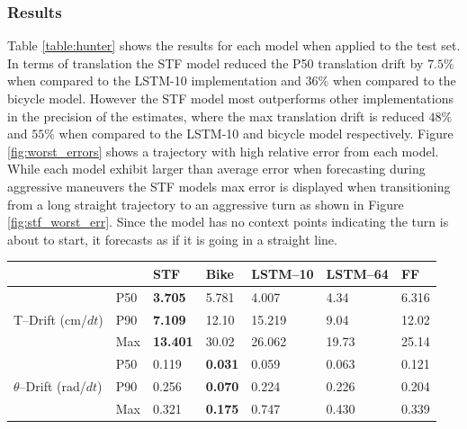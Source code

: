 \documentclass[letterpaper, 10 pt, conference]{ieeeconf}  %
\begin{document}
 \subsubsection{Results}


Table \ref{table:hunter} shows the results for each model when applied to the test set. In terms of translation the STF model reduced the P50 translation drift by $7.5\%$ when compared to the LSTM-10 implementation and $36\%$ when compared to the bicycle model. However the STF model most outperforms other implementations in the precision of the estimates, where the max translation drift is reduced $48\%$ and $55\%$ when compared to the LSTM-10 and bicycle model respectively. Figure \ref{fig:worst_errors} shows a trajectory with high relative error from each model. While each model exhibit larger than average error when forecasting during aggressive maneuvers the STF models max error is displayed when transitioning from a long straight trajectory to an aggressive turn as shown in Figure \ref{fig:stf_worst_err}. Since the model has no context points indicating the turn is about to start, it forecasts as if it is going in a straight line. 

\begin{center}
\label{table:hunter}
\begin{tabular}{ |p{2.6em}|p{1.8em}|p{2.4em}|p{2.0em}|p{2.6em}|p{2.6em}|p{2.0em}|}

\hline
\multicolumn{2}{|c|}{ } & STF \cite{grigsby2021longrange} & Bike \cite{bikemodel} & LSTM--10 & LSTM--64& FF \cite{goldfain2019autorally}\\ 
\hline
\multirow{3}{4em}{T--Drift (cm/$dt$)} & P50 &\textbf{3.705} & 5.781 & 4.007 & 4.34 & 6.316\\
&P90 & \textbf{7.109} & 12.10 & 15.219 & 9.04 & 12.02\\
&Max & \textbf{13.401} & 30.02 & 26.062 & 19.73 & 25.14\\
\hline
\multirow{3}{4em}{$\theta$--Drift (rad/$dt$)}& P50 & 0.119 & \textbf{0.031} & 0.059 & 0.063 & 0.121 \\
& P90 & 0.256 & \textbf{0.070} & 0.224 & 0.226 & 0.204\\
& Max & 0.321 & \textbf{0.175} & 0.747 & 0.430 & 0.339\\
\hline
\end{tabular}
\end{center}
\end{document}
